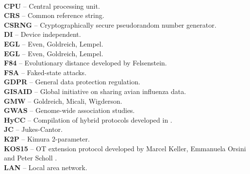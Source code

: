 \vspace{0.5cm}\\
\textbf{CPU} -- Central processing unit.
\vspace{0.5cm}\\
\textbf{CRS} -- Common reference string.
\vspace{0.5cm}\\
\textbf{CSRNG} -- Cryptographically secure pseudorandom number generator.
\vspace{0.5cm}\\
\textbf{DI} -- Device independent.
\vspace{0.5cm}\\
\textbf{EGL} -- Even, Goldreich, Lempel.
\vspace{0.5cm}\\
\textbf{EGL} -- Even, Goldreich, Lempel.
\vspace{0.5cm}\\
\textbf{F84} -- Evolutionary distance developed by Felsenstein.
\vspace{0.5cm}\\
\textbf{FSA} -- Faked-state attacks.
\vspace{0.5cm}\\
\textbf{GDPR} -- General data protection regulation.
\vspace{0.5cm}\\
\textbf{GISAID} -- Global initiative on sharing avian influenza data.
\vspace{0.5cm}\\
\textbf{GMW} -- Goldreich, Micali, Wigderson.
\vspace{0.5cm}\\
\textbf{GWAS} -- Genome-wide association studies.
\vspace{0.5cm}\\
\textbf{HyCC} -- Compilation of hybrid protocols developed in \cite{Bscher2018}.
\vspace{0.5cm}\\
\textbf{JC} -- Jukes-Cantor.
\vspace{0.5cm}\\
\textbf{K2P} -- Kimura 2-parameter.
\vspace{0.5cm}\\
\textbf{KOS15} -- OT extension protocol developed by Marcel Keller, Emmanuela Orsini and Peter Scholl \cite{KOS15}.
\vspace{0.5cm}\\
\textbf{LAN} -- Local area network.
\vspace{0.5cm}\\

